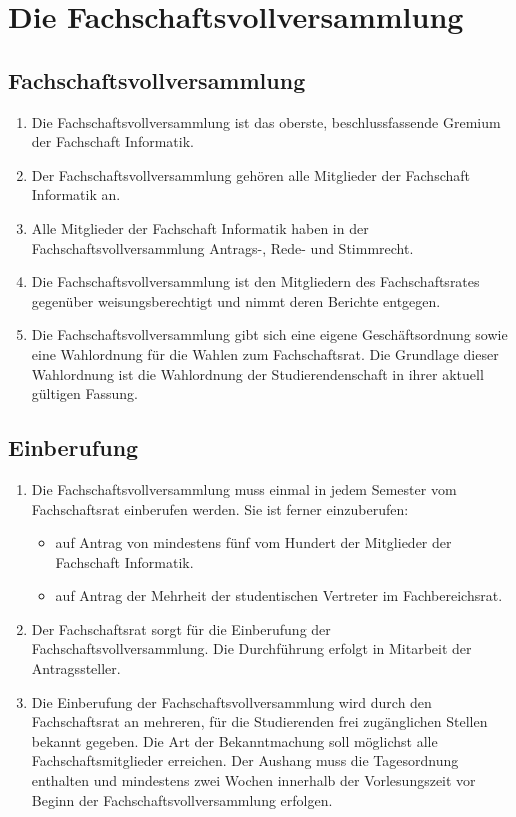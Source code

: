 \section {Die Fachschaftsvollversammlung}

\subsection{Fachschaftsvollversammlung}
\begin{enumerate}
	\item Die Fachschaftsvollversammlung ist das oberste, beschlussfassende Gremium der Fachschaft Informatik.
	\item Der Fachschaftsvollversammlung gehören alle Mitglieder der Fachschaft Informatik an.
	\item Alle Mitglieder der Fachschaft Informatik haben in der Fachschaftsvollversammlung Antrags-, Rede- und Stimmrecht.
	\item Die Fachschaftsvollversammlung ist den Mitgliedern des Fachschaftsrates gegenüber weisungsberechtigt und nimmt deren Berichte entgegen.
	\item Die Fachschaftsvollversammlung gibt sich eine eigene Geschäftsordnung sowie eine Wahlordnung für die Wahlen zum Fachschaftsrat. Die Grundlage dieser Wahlordnung ist die Wahlordnung der Studierendenschaft in ihrer aktuell gültigen Fassung.
\end{enumerate}

\subsection{Einberufung}
\begin{enumerate}
	\item Die Fachschaftsvollversammlung muss einmal in jedem Semester vom Fachschaftsrat einberufen werden. Sie ist ferner einzuberufen:
	\begin{itemize}
		\item auf Antrag von mindestens fünf vom Hundert der Mitglieder der Fachschaft Informatik.
		\item auf Antrag der Mehrheit der studentischen Vertreter im Fachbereichsrat.
	\end{itemize}
	\item Der Fachschaftsrat sorgt für die Einberufung der Fachschaftsvollversammlung. Die Durchführung erfolgt in Mitarbeit der Antragssteller.
	\item Die Einberufung der Fachschaftsvollversammlung wird durch den Fachschaftsrat an mehreren, für die Studierenden frei zugänglichen Stellen bekannt gegeben. Die Art der Bekanntmachung soll möglichst alle Fachschaftsmitglieder erreichen. Der Aushang muss die Tagesordnung enthalten und mindestens zwei Wochen innerhalb der Vorlesungszeit vor Beginn der Fachschaftsvollversammlung erfolgen.
\end{enumerate}

